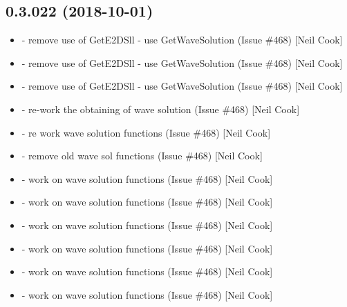 \documentclass[a4paper,10pt,english]{report}
\begin{document}
\subsection{0.3.022 (2018-10-01)}
\label{\detokenize{misc/changelog:id310}}\begin{itemize}
\item {} 
 - remove use of GetE2DSll - use
GetWaveSolution (Issue \#468) {[}Neil Cook{]}

\item {} 
 - remove use of GetE2DSll - use GetWaveSolution (Issue
\#468) {[}Neil Cook{]}

\item {} 
 - remove use of GetE2DSll - use GetWaveSolution
(Issue \#468) {[}Neil Cook{]}

\item {} 
 - re-work the obtaining of wave solution (Issue \#468)
{[}Neil Cook{]}

\item {} 
 - re work wave solution functions (Issue \#468) {[}Neil
Cook{]}

\item {} 
 - remove old wave sol functions (Issue \#468)
{[}Neil Cook{]}

\item {} 
 - work on wave solution functions (Issue \#468)
{[}Neil Cook{]}

\item {} 
 - work on wave solution functions (Issue \#468) {[}Neil
Cook{]}

\item {} 
 - work on wave solution functions (Issue
\#468) {[}Neil Cook{]}

\item {} 
 - work on wave solution functions (Issue \#468)
{[}Neil Cook{]}

\item {} 
 - work on wave solution functions (Issue \#468)
{[}Neil Cook{]}

\item {} 
 - work on wave solution functions (Issue \#468)
{[}Neil Cook{]}


\end{itemize}
\end{document}
